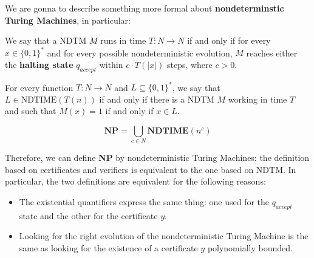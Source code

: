 We are gonna to describe something more formal about \textbf{nondeterminstic Turing Machines}, in particular:
\begin{definition}
    We say that a NDTM $M$ runs in time $T: N \rightarrow N$ if and only if for every $x \in \{0,1\}^*$ and for every possible nondeterministic evolution, 
    $M$ reaches either the \textbf{halting state} $q_{accept}$ within $c \cdot T(|x|)$ steps, where $c > 0$.
\end{definition}
\begin{definition}
    For every function $T: N \rightarrow N$ and $L \subseteq \{0,1\}^*$, we say that $L \in \text{NDTIME}(T(n))$ if and only if there is a NDTM $M$ working 
    in time $T$ and such that $M(x) = 1$ if and only if $x \in L$.
\end{definition}
\begin{definition}[title = Theorem]
    $$\textbf{NP} = \bigcup_{c \in N} \textbf{NDTIME}(n^c)$$
\end{definition}
Therefore, we can define \textbf{NP} by nondeterministic Turing Machines: the definition based on certificates and verifiers is equivalent to the one based on NDTM. 
In particular, the two definitions are equivalent for the following reasons:
\begin{itemize}
    \renewcommand{\labelitemi}{-}
    \item The existential quantifiers express the same thing: one used for the $q_{accept}$ state and the other for the certificate $y$.
    \item Looking for the right evolution of the nondeterministic Turing Machine is the same as looking for the existence of a certificate $y$ polynomially bounded.
\end{itemize}